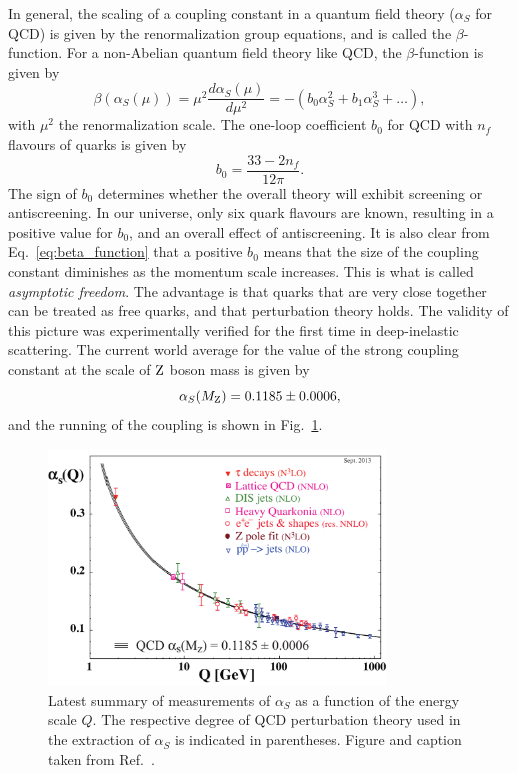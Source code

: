 In general, the scaling of a coupling constant in a quantum field theory ($\alpha_S$ for QCD) is
given by the renormalization group equations, and is called the $\beta$-function. For a non-Abelian
quantum field theory like QCD, the $\beta$-function is given by
\begin{equation}
\beta(\alpha_S(\mu)) = \mu^2 \frac{d\alpha_S(\mu)}{d\mu^2} = - (b_0 \alpha_S^2 +  b_1 \alpha_S^3 +
\ldots), 
\label{eq:beta_function}
\end{equation}
with $\mu^2$ the renormalization scale. The one-loop coefficient $b_0$ for QCD with $n_f$ flavours
of quarks is given by
\begin{equation}
  b_0 = \frac{33 - 2n_f}{12\pi}.
\end{equation}
The sign of $b_0$ determines whether the overall theory will exhibit screening or antiscreening. In
our universe, only six quark flavours are known, resulting in a positive value for $b_0$, and an
overall effect of antiscreening. 
It is also clear from Eq.~\ref{eq:beta_function} that a positive $b_0$ means that the size of the
coupling constant diminishes as the momentum scale increases. This is what is called
\textit{asymptotic freedom}. The advantage is that quarks that are very close together can be
treated as free quarks, and that perturbation theory holds. The validity of this picture was
experimentally verified for the first time in deep-inelastic scattering. 
The current world average for the value of the strong coupling constant at the scale of $\mathrm{Z}$
boson mass is given by
\begin{equation}
  \alpha_S(M_{\mathrm{Z}}) = 0.1185 \pm 0.0006, 
\end{equation}
and the running of the coupling is shown in Fig.~\ref{fig:running_coupling}. 

\begin{figure}[htpb]
  \centering
  \includegraphics[width=0.8\textwidth]{figures/standardmodel/asq-2013}
  \caption{Latest summary of measurements of $\alpha_S$ as a function of the energy scale $Q$.
The respective degree of QCD perturbation theory used in the extraction of $\alpha_S$ is
indicated in parentheses. Figure and caption taken from Ref.~\cite{Agashe:2014kda}.
  \label{fig:running_coupling}}
\end{figure}

